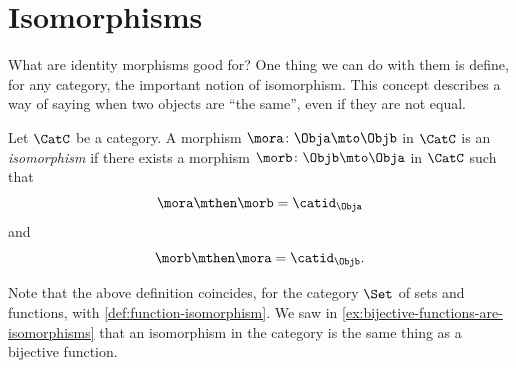 
\section[Isomorphisms]{Isomorphisms}
\label{sec:isomorphisms}



What are identity morphisms good for? One thing we can do with them is define, for any category, the important notion of isomorphism.
This concept describes a way of saying when two objects are ``the same'', even if they are not equal.

\begin{definition}\label{def:isomorphism}
    Let $\CatC$ be a category.
    A morphism $\mora \colon \Obja \mto \Objb$ in $\CatC$ is an \emph{isomorphism} if there exists a morphism $\morb \colon \Objb \mto \Obja$ in $\CatC$ such that
    \begin{equation}
        \mora \mthen \morb = \catid_\Obja
    \end{equation}
    and
    \begin{equation}
        \morb \mthen \mora = \catid_\Objb.
    \end{equation}
\end{definition}

\begin{remark}
    Note that the above definition coincides, for the category $\Set$ of sets and functions, with \cref{def:function-isomorphism}.
    We saw in \cref{ex:bijective-functions-are-isomorphisms} that an isomorphism in the category \Set is the same thing as a bijective function.
\end{remark}



